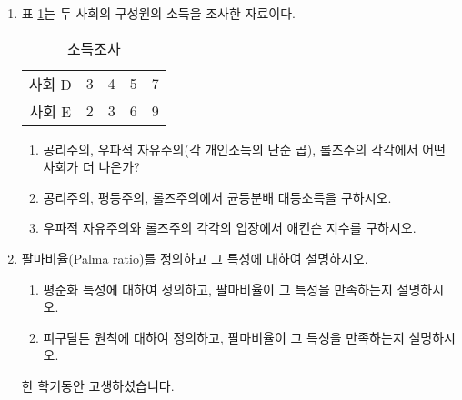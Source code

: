 \documentclass{article}
\begin{document}
\begin{enumerate}[{\bf 문제 \arabic*.}]
    \item 표 \ref{tab:income}는 두 사회의 구성원의 소득을 조사한 자료이다.
        \begin{table}[htbp]
            \centering
            \begin{tabular}{c|c|c|c|c}
                \toprule
                   사회 D & 3 & 4 & 5 & 7 \\
                   사회 E & 2 & 3 & 6 & 9 \\ 
                \bottomrule
            \end{tabular}
            \caption{소득조사}
            \label{tab:income}
        \end{table}
        \begin{enumerate}
            \item 공리주의, 우파적 자유주의(각 개인소득의 단순 곱), 롤즈주의 각각에서 어떤 사회가 더 나은가?
            \item 공리주의, 평등주의, 롤즈주의에서 균등분배 대등소득을 구하시오.
            \item 우파적 자유주의와 롤즈주의 각각의 입장에서 애킨슨 지수를 구하시오.
        \end{enumerate}
        
    \item 팔마비율(Palma ratio)를 정의하고 그 특성에 대하여 설명하시오.
        \begin{enumerate}
            \item 평준화 특성에 대하여 정의하고, 팔마비율이 그 특성을 만족하는지 설명하시오.
            \item 피구달튼 원칙에 대하여 정의하고, 팔마비율이 그 특성을 만족하는지 설명하시오.
        \end{enumerate}

    

\vspace{3cm}

    \centering
    \large{한 학기동안 고생하셨습니다.}
  
\end{enumerate}



\end{document}
